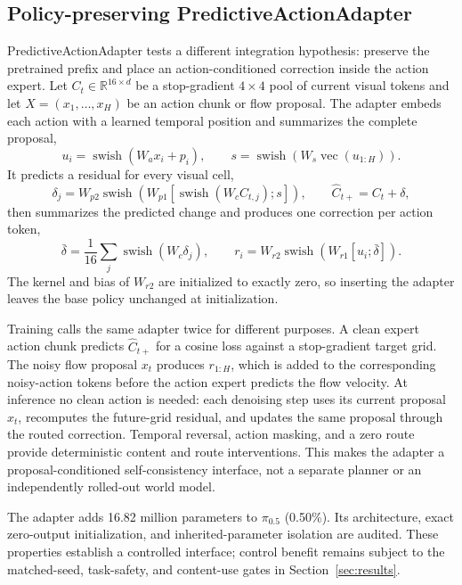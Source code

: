\subsection{Policy-preserving PredictiveActionAdapter}
PredictiveActionAdapter tests a different integration hypothesis: preserve the
pretrained prefix and place an action-conditioned correction inside the action
expert.  Let $C_t\in\mathbb{R}^{16\times d}$ be a stop-gradient $4\times4$
pool of current visual tokens and let
$X=(x_1,\ldots,x_H)$ be an action chunk or flow proposal.  The adapter embeds
each action with a learned temporal position and summarizes the complete
proposal,
\begin{equation}
 u_i=\operatorname{swish}(W_a x_i+p_i),\qquad
 s=\operatorname{swish}(W_s\operatorname{vec}(u_{1:H})).
\end{equation}
It predicts a residual for every visual cell,
\begin{equation}
 \delta_j=W_{p2}\operatorname{swish}
   (W_{p1}[\operatorname{swish}(W_c C_{t,j});s]),\qquad
 \hat C_{t+}=C_t+\delta,
\end{equation}
then summarizes the predicted change and produces one correction per action
token,
\begin{equation}
 \bar\delta=\frac{1}{16}\sum_j\operatorname{swish}(W_c\delta_j),\qquad
 r_i=W_{r2}\operatorname{swish}(W_{r1}[u_i;\bar\delta]).
\end{equation}
The kernel and bias of $W_{r2}$ are initialized to exactly zero, so inserting
the adapter leaves the base policy unchanged at initialization.

Training calls the same adapter twice for different purposes.  A clean expert
action chunk predicts $\hat C_{t+}$ for a cosine loss against a stop-gradient
target grid.  The noisy flow proposal $x_t$ produces $r_{1:H}$, which is added
to the corresponding noisy-action tokens before the action expert predicts the
flow velocity.  At inference no clean action is needed: each denoising step
uses its current proposal $x_t$, recomputes the future-grid residual, and
updates the same proposal through the routed correction.  Temporal reversal,
action masking, and a zero route provide deterministic content and route
interventions.  This makes the adapter a proposal-conditioned self-consistency
interface, not a separate planner or an independently rolled-out world model.

The adapter adds 16.82 million parameters to $\pi_{0.5}$ (0.50\%).  Its
architecture, exact zero-output initialization, and inherited-parameter
isolation are audited.  These properties establish a controlled interface;
control benefit remains subject to the matched-seed, task-safety, and
content-use gates in Section~\ref{sec:results}.
